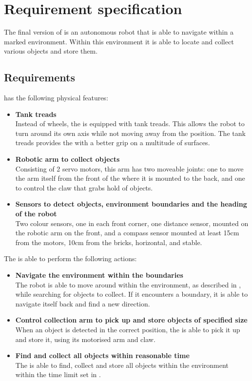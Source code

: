 \section{Requirement specification} \label{sec:requirement_specification}

The final version of \projname{} is an autonomous robot that is able to navigate within a marked environment. Within this environment it is able to locate and collect various objects and store them.

\subsection{Requirements}

\projname{} has the following physical features:

\begin{itemize}
    \item \textbf{Tank treads}\\
        Instead of wheels, the \projname{} is equipped with tank treads. This allows the robot to turn around its own axis while not moving away from the position. The tank treads provides the \projname{} with a better grip on a multitude of surfaces.
    \item \textbf{Robotic arm to collect objects}\\
        Consisting of 2 servo motors, this arm has two moveable joints: one to move the arm itself from the front of the \projname{} where it is mounted to the back, and one to control the claw that grabs hold of objects.
    \item \textbf{Sensors to detect objects, environment boundaries and the heading of the robot}\\
        Two colour sensors, one in each front corner, one distance sensor, mounted on the robotic arm on the front, and a compass sensor mounted at least 15cm from the motors, 10cm from the bricks, horizontal, and stable.
    \end{itemize}
    
The \projname{} is able to perform the following actions:

    \begin{itemize}
    \item \textbf{Navigate the environment within the boundaries}\\
        The robot is able to move around within the environment, as described in , while searching for objects to collect. If it encounters a boundary, it is able to navigate itself back and find a new direction.
    \item \textbf{Control collection arm to pick up and store objects of specified size}\\
        When an object is detected in the correct position, the \projname{} is able to pick it up and store it, using its motorised arm and claw.
    \item \textbf{Find and collect all objects within reasonable time}\\
        The \projname{} is able to find, collect and store all objects within the environment within the time limit set in .
\end{itemize}

